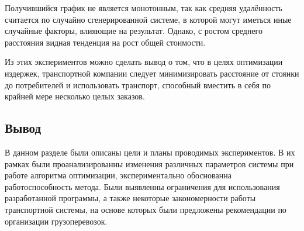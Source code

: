 Получившийся график не является монотонным, так как средняя удалённость считается по случайно сгенерированной системе, в которой могут иметься иные случайные факторы, влияющие на результат. Однако, с ростом среднего расстояния видная тенденция на рост общей стоимости. 

Из этих экспериментов можно сделать вывод о том, что в целях оптимизации издержек, транспортной компании следует минимизировать расстояние от стоянки до потребителей и использовать транспорт, способный вместить в себя по крайней мере несколько целых заказов.

\subsection*{Вывод}
В данном разделе были описаны цели и планы проводимых экспериментов. В их рамках были проанализированны изменения различных параметров системы при работе алгоритма оптимизации, экспериментально обоснованна работоспособность метода. Были выявленны ограничения для использования разработанной программы, а также некоторые закономерности работы транспортной системы, на основе которых были предложены рекомендации по организации грузоперевозок. 

\pagebreak